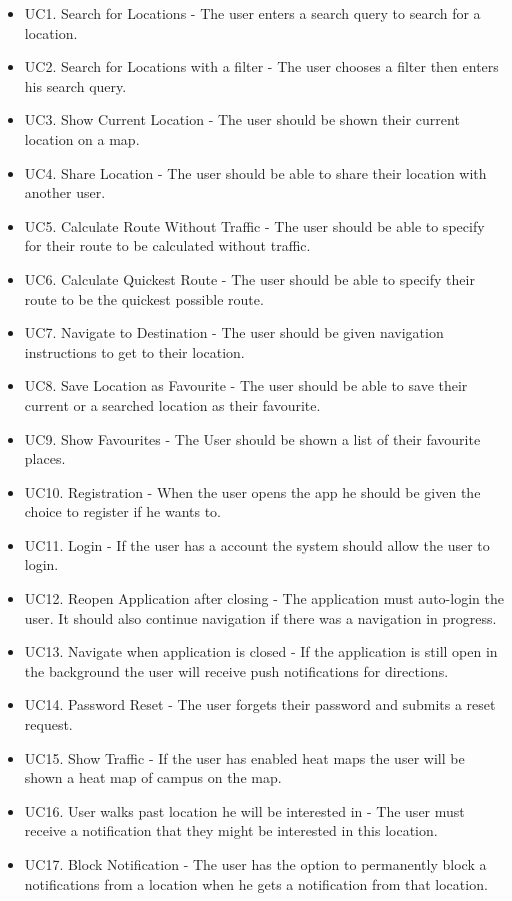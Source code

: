 \documentclass[11pt]{article}
\begin{document}
	\begin{itemize}
	\item UC1. Search for Locations - The user enters a search query to search for a location.
	\item UC2. Search for Locations with a filter - The user chooses a filter then enters his search query.
	\item UC3. Show Current Location - The user should be shown their current location on a map.
	\item UC4. Share Location - The user should be able to share their location with another user.
	\item UC5. Calculate Route Without Traffic - The user should be able to specify for their route to be calculated without traffic.
	\item UC6. Calculate Quickest Route - The user should be able to specify their route to be the quickest possible route.
	\item UC7. Navigate to Destination - The user should be given navigation instructions to get to their location.
	\item UC8. Save Location as Favourite - The user should be able to save their current or a searched location as their favourite.
	\item UC9. Show Favourites - The User should be shown a list of their favourite places.
	\item UC10. Registration - When the user opens the app he should be given the choice to register if he wants to.
	\item UC11. Login - If the user has a account the system should allow the user to login.
	\item UC12. Reopen Application after closing - The application must auto-login the user. It should also continue navigation if there was a navigation in progress.
	\item UC13. Navigate when application is closed - If the application is still open in the background the user will receive push notifications for directions.
	\item UC14. Password Reset - The user forgets their password and submits a reset request.
	\item UC15. Show Traffic - If the user has enabled heat maps the user will be shown a heat map of campus on the map.
	\item UC16. User walks past location he will be interested in - The user must receive a notification that they might be interested in this location.
	\item UC17. Block Notification - The user has the option to permanently block a notifications from a location when he gets a notification from that location.

\end{itemize}
\end{document}
